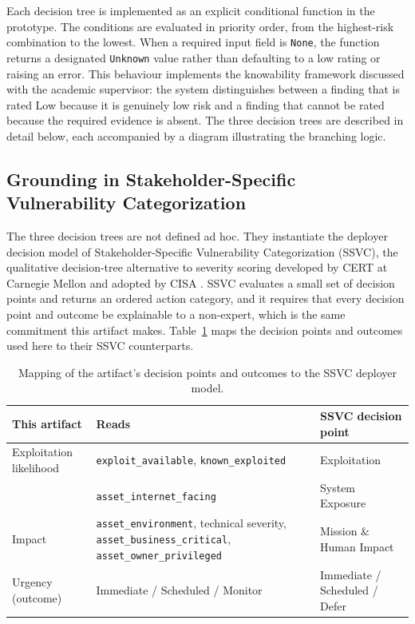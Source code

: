 Each decision tree is implemented as an explicit conditional function 
in the prototype. The conditions are evaluated in priority order, 
from the highest-risk combination to the lowest. When a required 
input field is \texttt{None}, the function returns a designated 
\texttt{Unknown} value rather than defaulting to a low rating or 
raising an error. This behaviour implements the knowability framework 
discussed with the academic supervisor: the system distinguishes 
between a finding that is rated Low because it is genuinely low risk 
and a finding that cannot be rated because the required evidence is 
absent. The three decision trees are described in detail below, each 
accompanied by a diagram illustrating the branching logic.

\subsection{Grounding in Stakeholder-Specific Vulnerability Categorization}
\label{subsec:ssvc-grounding}

The three decision trees are not defined ad hoc. They instantiate the deployer decision model of Stakeholder-Specific Vulnerability Categorization (SSVC), the qualitative decision-tree alternative to severity scoring developed by CERT at Carnegie Mellon and adopted by CISA \cite{spring2021ssvc}. SSVC evaluates a small set of decision points and returns an ordered action category, and it requires that every decision point and outcome be explainable to a non-expert, which is the same commitment this artifact makes. Table~\ref{tab:ssvc-mapping} maps the decision points and outcomes used here to their SSVC counterparts.

\begin{table}[h]
\centering
\begin{tabular}{@{}lp{}l@{}}
\toprule
\textbf{This artifact} & \textbf{Reads} & \textbf{SSVC decision point} \\
\midrule
Exploitation likelihood & \texttt{exploit\_available}, \texttt{known\_exploited} & Exploitation \\
                        & \texttt{asset\_internet\_facing} & System Exposure \\
Impact                  & \texttt{asset\_environment}, technical severity, \texttt{asset\_business\_critical}, \texttt{asset\_owner\_privileged} & Mission \& Human Impact \\
Urgency (outcome)       & Immediate / Scheduled / Monitor & Immediate / Scheduled / Defer \\
\bottomrule
\end{tabular}
\caption{Mapping of the artifact's decision points and outcomes to the SSVC deployer model.}
\label{tab:ssvc-mapping}
\end{table}

